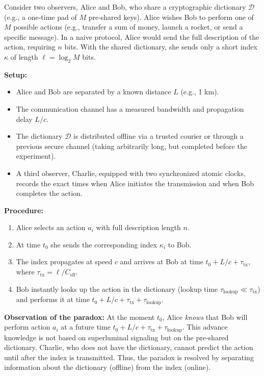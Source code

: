\documentclass[12pt]{article}
\begin{document}
	Consider two observers, Alice and Bob, who share a cryptographic dictionary \( \mathcal{D} \) (e.g., a one‑time pad of \(M\) pre‑shared keys). Alice wishes Bob to perform one of \(M\) possible actions (e.g., transfer a sum of money, launch a rocket, or send a specific message). In a naive protocol, Alice would send the full description of the action, requiring \(n\) bits. With the shared dictionary, she sends only a short index \(\kappa\) of length \(\ell = \log_2 M\) bits.
	
	\textbf{Setup:}
	\begin{itemize}
		\item Alice and Bob are separated by a known distance \(L\) (e.g., 1 km).
		\item The communication channel has a measured bandwidth and propagation delay \(L/c\).
		\item The dictionary \(\mathcal{D}\) is distributed offline via a trusted courier or through a previous secure channel (taking arbitrarily long, but completed before the experiment).
		\item A third observer, Charlie, equipped with two synchronized atomic clocks, records the exact times when Alice initiates the transmission and when Bob completes the action.
	\end{itemize}
	
	\textbf{Procedure:}
	\begin{enumerate}
		\item Alice selects an action \(a_i\) with full description length \(n\).
		\item At time \(t_0\) she sends the corresponding index \(\kappa_i\) to Bob.
		\item The index propagates at speed \(c\) and arrives at Bob at time \(t_0 + L/c + \tau_{\text{tx}}\), where \(\tau_{\text{tx}} = \ell / C_{\text{eff}}\).
		\item Bob instantly looks up the action in the dictionary (lookup time \(\tau_{\text{lookup}} \ll \tau_{\text{tx}}\)) and performs it at time \(t_0 + L/c + \tau_{\text{tx}} + \tau_{\text{lookup}}\).
	\end{enumerate}
	
	\textbf{Observation of the paradox:}
	At the moment \(t_0\), Alice \emph{knows} that Bob will perform action \(a_i\) at a future time \(t_0 + L/c + \tau_{\text{tx}} + \tau_{\text{lookup}}\). This advance knowledge is not based on superluminal signaling but on the pre‑shared dictionary. Charlie, who does not have the dictionary, cannot predict the action until after the index is transmitted. Thus, the paradox is resolved by separating information about the dictionary (offline) from the index (online).
	
\end{document}

